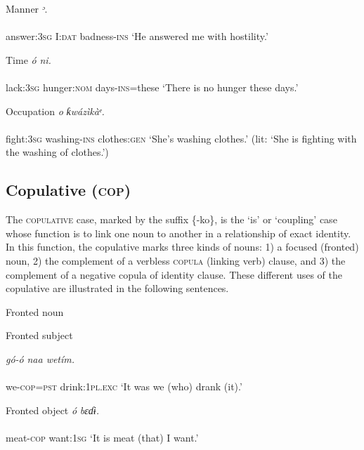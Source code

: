 Manner
\ea\label{ex:}
\textit{ᵓ}. \\
    \\
answer:\textsc{3sg}   I:\textsc{dat}   badness-\textsc{ins}
\glt ‘He answered me with hostility.’ 
\z




Time
\ea\label{ex:}
\textit{ó}\textit{ ni.} \\
    \\
lack:\textsc{3sg}   hunger:\textsc{nom}   days-\textsc{ins}=these
\glt ‘There is no hunger these days.’ 
\z




Occupation
\ea\label{ex:}
\textit{o}\textit{   ƙwázìkàᵉ.} \\
    \\
fight:\textsc{3sg}   washing-\textsc{ins}   clothes:\textsc{gen}
\glt ‘She’s washing clothes.’ (lit: ‘She is fighting with the washing of clothes.’) 
\z






\subsection{Copulative (\textsc{cop})}


The \textsc{copulative} case, marked by the suffix \{-ko\}, is the ‘is’ or ‘coupling’ case whose function is to link one noun to another in a relationship of exact identity. In this function, the copulative marks three kinds of nouns: 1) a focused (fronted) noun, 2) the complement of a verbless \textsc{copula} (linking verb) clause, and 3) the complement of a negative copula of identity clause. These different uses of the copulative are illustrated in the following sentences.




Fronted noun




Fronted subject


\ea\label{ex:}
\textit{gó-}\textit{ó}\textit{ naa   wetím.} \\
    \\
we-\textsc{cop}=\textsc{pst}   drink:\textsc{1pl.exc}
\glt ‘It was we (who) drank (it).’ 
\z




Fronted object
\ea\label{ex:}
\textit{ó}\textit{     bɛɗɨ.} \\
    \\
meat-\textsc{cop}   want:\textsc{1sg}
\glt ‘It is meat (that) I want.’ 
\z




